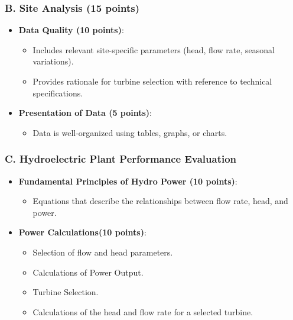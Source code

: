\documentclass[11pt]{article}
\begin{document}
\subsubsection*{B. Site Analysis (15 points)}
\begin{itemize}
    \item \textbf{Data Quality (10 points)}:
    \begin{itemize}
        \item Includes relevant site-specific parameters (head, flow rate, seasonal variations).
        \item Provides rationale for turbine selection with reference to technical specifications.
    \end{itemize}
    \item \textbf{Presentation of Data (5 points)}:
    \begin{itemize}
        \item Data is well-organized using tables, graphs, or charts.
    \end{itemize}
\end{itemize}

\subsubsection*{C. Hydroelectric Plant Performance Evaluation}
\begin{itemize}
     \item \textbf{Fundamental Principles of Hydro Power (10 points)}:
    \begin{itemize}
        \item Equations that describe the relationships between flow rate, head, and power.
    \end{itemize}
    \item \textbf{Power Calculations(10 points)}:
    \begin{itemize}
        \item Selection of flow and head parameters.
        \item Calculations of Power Output.
        \item Turbine Selection.
        \item Calculations of the head and flow rate for a selected turbine.
    \end{itemize}
\end{itemize}
\end{document}
